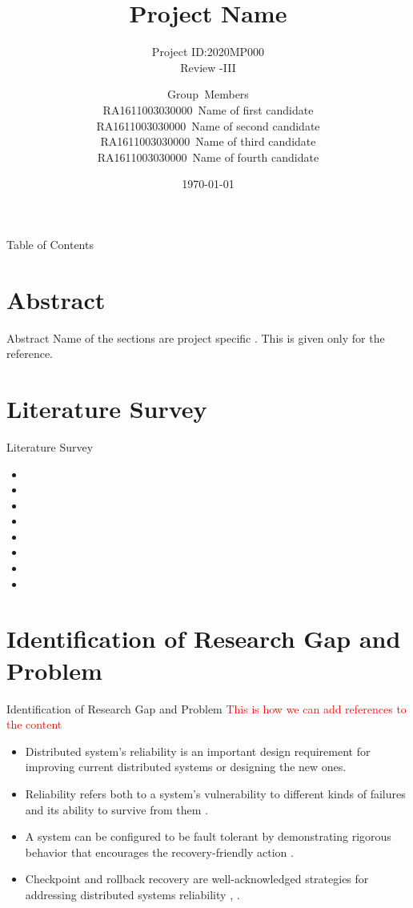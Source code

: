 \documentclass{beamer}
\title[2020MP000]{Project Name}
\subtitle{Project ID:2020MP000\\Review -III}
\author[SRM Institute of Science \& Technology]{Group~Members\\RA1611003030000~Name of first candidate\\RA1611003030000~Name of second candidate\\RA1611003030000~Name of third candidate\\RA1611003030000~Name of fourth candidate\\ \medskip{Supervised By:\\Dr. XXX \\Designation}}
\institute[]{Department of Computer Science \& Engineering\\Faculty of Engineering \& Technology\\SRM Institute of Science \& Technology}
\date{\today}
\begin{document}
	\begin{frame}
		\maketitle
		\date{}
			\end{frame}
	\begin{frame}[allowframebreaks]{Table of Contents} %
		\tableofcontents[sections={1-6}]
		\framebreak
		\tableofcontents[sections={7-10}]
	\end{frame}
	\section{Abstract}
	\begin{frame}{Abstract}
		\LARGE
	Name of the sections are project specific . This is given only for the reference.
	\end{frame}
	\section{Literature Survey}
	\begin{frame}{Literature Survey}
	\begin{itemize}
		
		\item 
		\item
		\item 
		\item 
		\item 
		\item
		\item 
		\item 
		\end{itemize} 
	\end{frame}
\section{Identification of Research Gap and Problem}
\begin{frame}[t]{Identification of Research Gap and Problem}
	\LARGE
	\textcolor{red}{This is how we can add references to the content}
	\bigskip
	\normalsize
	\begin{itemize}
		\item Distributed system’s reliability is	an important design requirement for improving current distributed systems or designing the new ones. 
		\medskip
		\item Reliability	refers both to a system’s vulnerability to different kinds of failures and its ability to survive from them \cite{ozsu2011principles}.
		\medskip
		\item A system can be configured to be fault tolerant by demonstrating rigorous behavior that encourages the recovery-friendly action \cite{jandl2005increasing}.
		\medskip
		\item Checkpoint and rollback recovery are well-acknowledged strategies for addressing distributed systems reliability \cite{manivannan2002asynchronous}, \cite{manivannan1999quasi}.
	\end{itemize}
\end{frame}
\end{document}
